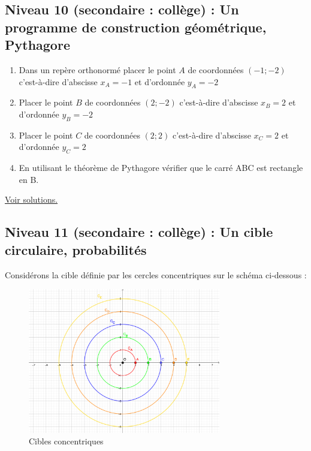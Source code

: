 \documentclass[11pt]{article}
\begin{document}
\newpage

\subsection{Niveau 10 (secondaire : collège) : Un programme de construction géométrique, Pythagore}
\label{sec:org95f1258}

\label{orgbf37817}


\begin{enumerate}
\item Dans un repère orthonormé placer le point \(A\) de coordonnées
\((-1 ; -2)\) c'est-à-dire d'abscisse \(x_A = -1\) et d'ordonnée
\(y_A = -2\)
\item Placer le point \(B\) de coordonnées \((2 ; -2)\) c'est-à-dire
d'abscisse \(x_B = 2\) et d'ordonnée \(y_B = -2\)
\item Placer le point \(C\) de coordonnées \((2 ; 2)\) c'est-à-dire
d'abscisse \(x_C = 2\) et d'ordonnée \(y_C = 2\)
\item En utilisant le théorème de Pythagore vérifier que le carré ABC est
rectangle en B.
\end{enumerate}



\hyperref[org87f9f65]{Voir solutions.}




\newpage

\subsection{Niveau 11 (secondaire : collège) : Un cible circulaire, probabilités}
\label{sec:org1566092}

\label{org4b30b54}

Considérons la cible définie par les cercles concentriques sur le
schéma ci-dessous :


\begin{figure}[htbp]
\centering
\includegraphics[width=0.75\textwidth]{./images/cible-proba.png}
\caption{Cibles concentriques}
\end{figure}
\end{document}
